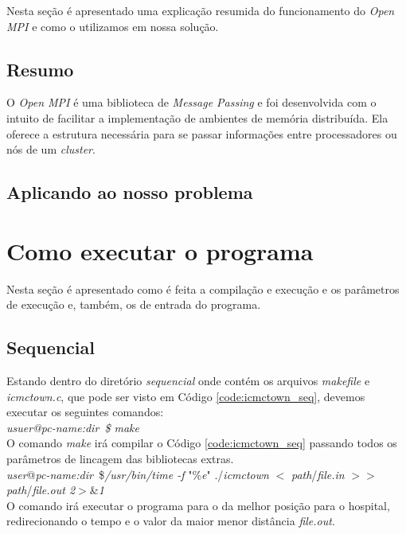 \documentclass[11pt,twoside]{article}
\begin{document}
    Nesta seção é apresentado uma explicação resumida do funcionamento do {\it Open MPI}
    e como o utilizamos em nossa solução.

    \subsection{Resumo}
    O {\it Open MPI} é uma biblioteca de {\it Message Passing} e foi desenvolvida com o intuito de facilitar a implementação de ambientes de memória distribuída.
    Ela oferece a estrutura necessária para se passar informações entre processadores ou nós de um {\it cluster}.

    \subsection{Aplicando ao nosso problema}

\section{Como executar o programa}
    
    Nesta seção é apresentado como é feita a compilação e execução e os parâmetros de execução
    e, também, os de entrada do programa.
    
    \subsection{Sequencial}
    
	    Estando dentro do diretório {\it sequencial} onde contém os arquivos
		{\it makefile} e {\it icmctown.c}, que pode ser visto em Código
		\ref{code:icmctown_seq}, devemos executar os seguintes comandos:\\

		{\it usuer@pc-name:dir~\$ make}\\

		O comando {\it make} irá compilar o Código \ref{code:icmctown_seq} passando
		todos os parâmetros de lincagem das bibliotecas extras.\\

		{\it user}@{\it pc-name:dir~}\${\it /usr/bin/time -f }"\%{\it e}" ./{\it icmctown}
		$<$ {\it path}/{\it file.in} $>>$ {\it path}/{\it file.out 2}$>$\&{\it 1} \\

		O comando irá executar o programa para o da melhor posição para o hospital, 
		redirecionando o tempo e o valor da maior menor distância {\it file.out}.\\
\end{document}
